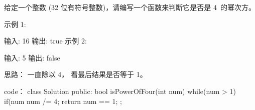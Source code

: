 给定一个整数 (32 位有符号整数)，请编写一个函数来判断它是否是 4 的幂次方。

示例 1:

输入: 16
输出: true
示例 2:

输入: 5
输出: false





















思路：
一直除以 4， 看最后结果是否等于 1。
























code：
class Solution {
public:
    bool isPowerOfFour(int num) {
        while(num > 1)
        {
            if(num %
            num /= 4;
        }
        return num == 1;
    }
};